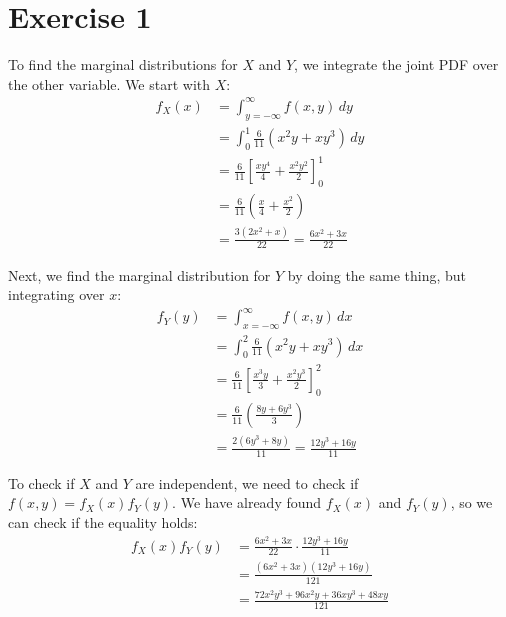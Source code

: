 \section{Exercise 1}

To find the marginal distributions for $X$ and $Y$, we integrate the joint PDF over the other variable. We start with $X$:
\begin{align*}
	f_X(x) & = \int_{y=-\infty}^{\infty} f(x,y) \, dy                          \\
	       & = \int_{0}^{1} \frac{6}{11}\left(x^2y + xy^3\right) \, dy         \\
	       & = \frac{6}{11} \left[ \frac{xy^4}{4}+\frac{x^2y^2}{2} \right]_0^1 \\
	       & = \frac{6}{11} \left( \frac{x}{4}+\frac{x^2}{2} \right)           \\
	       & = \frac{3(2x^2 + x)}{22} = \frac{6x^2 + 3x}{22}
\end{align*}

Next, we find the marginal distribution for $Y$ by doing the same thing, but integrating over $x$:
\begin{align*}
	f_Y(y) & = \int_{x=-\infty}^{\infty} f(x,y) \, dx                          \\
	       & = \int_{0}^{2} \frac{6}{11}\left(x^2y + xy^3\right) \, dx         \\
	       & = \frac{6}{11} \left[ \frac{x^3y}{3}+\frac{x^2y^3}{2} \right]_0^2 \\
	       & = \frac{6}{11} \left( \frac{8y+6y^3}{3} \right)                   \\
	       & = \frac{2(6y^3+8y)}{11} = \frac{12y^3+16y}{11}
\end{align*}

To check if $X$ and $Y$ are independent, we need to check if $f(x,y) = f_X(x)f_Y(y)$. We have already found $f_X(x)$ and $f_Y(y)$, so we can check if the equality holds:
\begin{align*}
	f_X(x)f_Y(y) & = \frac{6x^2+3x}{22} \cdot \frac{12y^3+16y}{11} \\
	             & = \frac{(6x^2+3x)(12y^3+16y)}{121}              \\
	             & = \frac{72x^2y^3+96x^2y+36xy^3+48xy}{121}
\end{align*}

